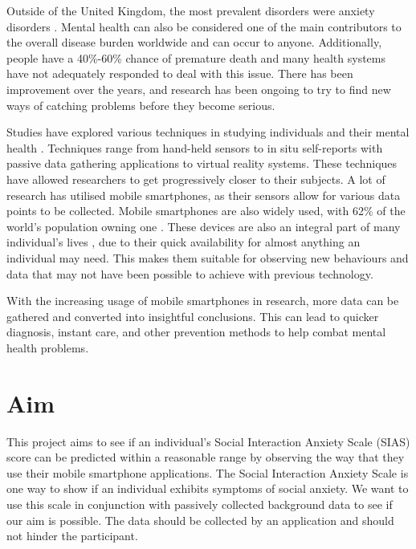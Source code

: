 \documentclass{l4proj}
\begin{document}
Outside of the United Kingdom, the most prevalent disorders were anxiety disorders \citep{2016_prevalent_disorder}. Mental health can also be considered one of the main contributors to the overall disease burden worldwide \citep{2019_isolated} and can occur to anyone. Additionally, people have a 40\%-60\% chance of premature death \citep{2013_mental_health_who} and many health systems have not adequately responded \citep{2013_mental_health_who} to deal with this issue. There has been improvement over the years, and research has been ongoing to try to find new ways of catching problems before they become serious.

Studies have explored various techniques in studying individuals and their mental health \citep{student_life_site, boukhechba, salmon, tracking_depression_college_using_phone, avoidance_behaviour}. Techniques range from hand-held sensors to in situ self-reports with passive data gathering applications to virtual reality systems. These techniques have allowed researchers to get progressively closer to their subjects. A lot of research has utilised mobile smartphones, as their sensors allow for various data points to be collected. Mobile smartphones are also widely used, with 62\% of the world's population owning one \citep{bankcell}. These devices are also an integral part of many individual's lives \citep{digital_dependence, always_connected}, due to their quick availability for almost anything an individual may need. This makes them suitable for observing new behaviours and data that may not have been possible to achieve with previous technology.

With the increasing usage of mobile smartphones in research, more data can be gathered and converted into insightful conclusions. This can lead to quicker diagnosis, instant care, and other prevention methods to help combat mental health problems.

\section{Aim}
This project aims to see if an individual's Social Interaction Anxiety Scale (SIAS) score can be predicted within a reasonable range by observing the way that they use their mobile smartphone applications. The Social Interaction Anxiety Scale is one way to show if an individual exhibits symptoms of social anxiety. We want to use this scale in conjunction with passively collected background data to see if our aim is possible. The data should be collected by an application and should not hinder the participant. 
\end{document}
